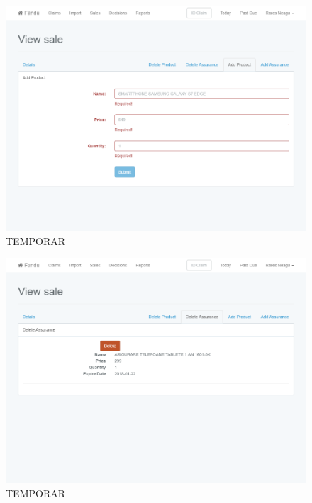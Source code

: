 	\begin{figure}
		\includegraphics[width=\linewidth]{../imagini/sales_add_product.png}
		\caption{TEMPORAR}
		\label{fig:TEMP}
	\end{figure}
	\begin{figure}
		\includegraphics[width=\linewidth]{../imagini/sales_delete_assurance.png}
		\caption{TEMPORAR}
		\label{fig:TEMP}
	\end{figure}
